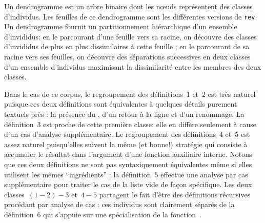 \begin{center}
\end{center}

Un dendrogramme est un arbre binaire dont les n{\oe}uds représentent
des classes d'individus. Les feuilles de ce dendrogramme sont les
différentes versions de \texttt{rev}. Un dendrogramme fournit un
partitionnement hiérarchique d'un ensemble d'invididus: en le
parcourant d'une feuille vers sa racine, on découvre des classes
d'invididus de plus en plus dissimilaires à cette feuille ; en le
parcourant de sa racine vers ses feuilles, on découvre des séparations
successives en deux classes d'un ensemble d'individus maximisant
la dissimilarité entre les membres des deux classes.  

Dans le cas de ce corpus, le regroupement des définitions~$1$ et~$2$
est très naturel puisque ces deux définitions sont équivalentes à
quelques détails purement textuels près : la présence du \iocaml{|},
d'un retour à la ligne et d'un renommage. La définition~$3$ est proche
de cette première classe: elle en diffère seulement à cause d'un cas
d'analyse supplémentaire. Le regroupement des définitions~$4$ et~$5$
est assez naturel puisqu'elles suivent la même (et bonne!) stratégie
qui consiste à accumuler le résultat dans l'argument d'une fonction
auxiliaire interne. Notons que ces deux définitions ne sont pas
syntaxiquement équivalentes même si elles utilisent les mêmes ``ingrédients'' :
la définition~$5$ effectue une analyse par cas supplémentaire pour
traiter le cas de la liste vide de façon spécifique. Les deux classes~$(1-2)-3$
et~$4-5$ partagent le fait d'être des définitions récursives procédant par
analyse de cas : ces individus sont clairement séparés de la définition~$6$
qui s'appuie sur une spécialisation de la fonction~.

